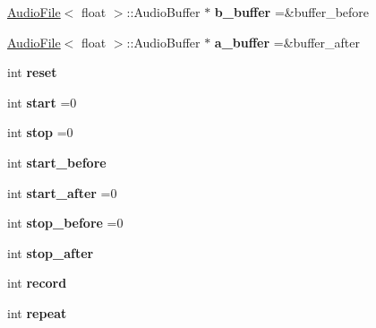 \begin{DoxyCompactItemize}
\mbox{\label{classfile__record_a3e3e09455d86f2efae75b78889db59dd}} 
\hyperlink{classAudioFile}{Audio\+File}$<$ float $>$\+::Audio\+Buffer $\ast$ {\bfseries b\+\_\+buffer} =\&buffer\+\_\+before
\item 
\mbox{\label{classfile__record_a5f89cc7ee12a6361417104e80026a7c6}} 
\hyperlink{classAudioFile}{Audio\+File}$<$ float $>$\+::Audio\+Buffer $\ast$ {\bfseries a\+\_\+buffer} =\&buffer\+\_\+after
\item 
\mbox{\label{classfile__record_a6253c481183e28aaa0efc7ddd9909828}} 
int {\bfseries reset}
\item 
\mbox{\label{classfile__record_af275a85249908eb6d7d5cbc6889d953a}} 
int {\bfseries start} =0
\item 
\mbox{\label{classfile__record_a90ea367c9a6fcd5841401e38abcd23ec}} 
int {\bfseries stop} =0
\item 
\mbox{\label{classfile__record_a3d6e170b7e801452adefb10d75b79878}} 
int {\bfseries start\+\_\+before}
\item 
\mbox{\label{classfile__record_a62463eef4f1c081e89522a9848101080}} 
int {\bfseries start\+\_\+after} =0
\item 
\mbox{\label{classfile__record_a88d105ebf3345ee063aa68fe6e6703c4}} 
int {\bfseries stop\+\_\+before} =0
\item 
\mbox{\label{classfile__record_a28ac14db371daa3b81300b2f58c34e11}} 
int {\bfseries stop\+\_\+after}
\item 
\mbox{\label{classfile__record_a2f82c2439243c3b026dfd57747ba1862}} 
int {\bfseries record}
\item 
\mbox{\label{classfile__record_a92f31f13d552154a6687f42bbf563d09}} 
int {\bfseries repeat}
\item 
\mbox{\label{classfile__record_aaec3da6ffc1e1bcba2177910a291f428}} 

\end{DoxyCompactItemize}
